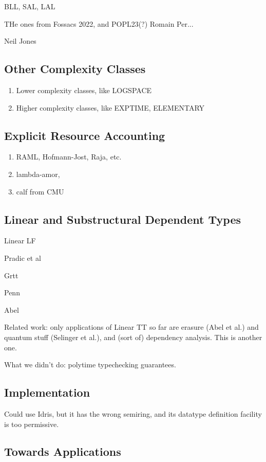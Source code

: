 \documentclass[acmsmall,review,screen,anonymous]{acmart}
\begin{document}
BLL, SAL, LAL

THe ones from Fossacs 2022, and POPL23(?) Romain Per...

Neil Jones

\subsection{Other Complexity Classes}

\begin{enumerate}
\item Lower complexity classes, like LOGSPACE
\item Higher complexity classes, like EXPTIME, ELEMENTARY
\end{enumerate}

\subsection{Explicit Resource Accounting}

\begin{enumerate}
\item RAML, Hofmann-Jost, Raja, etc.
\item lambda-amor,
\item calf from CMU
\end{enumerate}

\subsection{Linear and Substructural Dependent Types}

Linear LF

Pradic et al

Grtt

Penn

Abel

Related work: only applications of Linear TT so far are erasure (Abel
et al.) and quantum stuff (Selinger et al.), and (sort of) dependency
analysis. This is another one.

What we didn't do: polytime typechecking guarantees.

\subsection{Implementation} Could use Idris, but it has the wrong
semiring, and its datatype definition facility is too permissive.

\subsection{Towards Applications}
\end{document}
